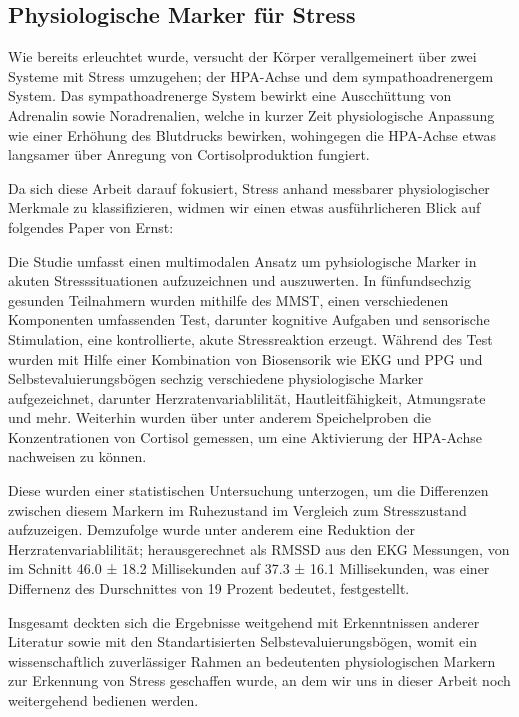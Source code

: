 \subsection{Physiologische Marker für Stress}

Wie bereits erleuchtet wurde, versucht der Körper verallgemeinert über zwei Systeme mit Stress umzugehen; der \ac{HPA-Achse} und dem sympathoadrenergem System. 
Das sympathoadrenerge System bewirkt eine Auscchüttung von Adrenalin sowie Noradrenalien, welche in kurzer Zeit physiologische Anpassung wie einer Erhöhung des Blutdrucks bewirken,
wohingegen die \ac{HPA-Achse} etwas langsamer über Anregung von Cortisolproduktion fungiert. \cite{Kaiser2023}

Da sich diese Arbeit darauf fokusiert, Stress anhand messbarer physiologischer Merkmale zu klassifizieren, widmen wir einen etwas ausführlicheren Blick auf folgendes Paper von Ernst:

Die Studie umfasst einen multimodalen Ansatz um pyhsiologische Marker in akuten Stresssituationen aufzuzeichnen und auszuwerten. In fünfundsechzig gesunden Teilnahmern wurden mithilfe des 
\ac{MMST}, einen verschiedenen Komponenten umfassenden Test, darunter kognitive Aufgaben und sensorische Stimulation, eine kontrollierte, akute Stressreaktion erzeugt. Während des Test wurden mit 
Hilfe einer Kombination von Biosensorik wie \ac{EKG} und \ac{PPG} und Selbstevaluierungsbögen sechzig verschiedene physiologische Marker aufgezeichnet, darunter Herzratenvariablilität, Hautleitfähigkeit, Atmungsrate und mehr.
Weiterhin wurden über unter anderem Speichelproben die Konzentrationen von Cortisol gemessen, um eine Aktivierung der \ac{HPA-Achse} nachweisen zu können. 

Diese wurden einer statistischen Untersuchung unterzogen, um die Differenzen zwischen diesem Markern im Ruhezustand im Vergleich zum Stresszustand aufzuzeigen. Demzufolge wurde unter anderem eine Reduktion der Herzratenvariablilität; 
herausgerechnet als \ac{RMSSD} aus den \ac{EKG} Messungen, von im Schnitt 46.0 ± 18.2 Millisekunden auf 37.3 ± 16.1 Millisekunden, was einer Differnenz des Durschnittes 
von 19 Prozent bedeutet, festgestellt. \cite{Ernst2023}

Insgesamt deckten sich die Ergebnisse weitgehend mit Erkenntnissen anderer Literatur sowie mit den Standartisierten Selbstevaluierungsbögen, womit ein wissenschaftlich zuverlässiger Rahmen an bedeutenten physiologischen Markern
zur Erkennung von Stress geschaffen wurde, an dem wir uns in dieser Arbeit noch weitergehend bedienen werden.


